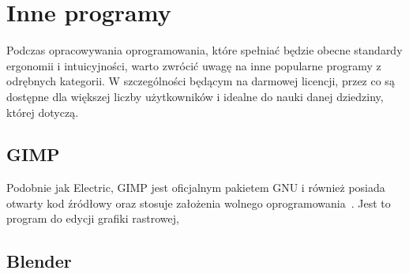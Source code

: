 \section{Inne programy}

Podczas opracowywania oprogramowania,
które spełniać będzie obecne standardy ergonomii i intuicyjności,
warto zwrócić uwagę na inne popularne programy z odrębnych kategorii.
W szczególności będącym na darmowej licencji,
przez co są dostępne dla większej liczby użytkowników
i idealne do nauki danej dziedziny, której dotyczą.

\subsection{GIMP}

Podobnie jak Electric, GIMP jest oficjalnym pakietem GNU i również posiada otwarty kod źródłowy
oraz stosuje założenia wolnego oprogramowania~\cite{gimp_site}.
Jest to program do edycji grafiki rastrowej, \todo

\subsection{Blender}
